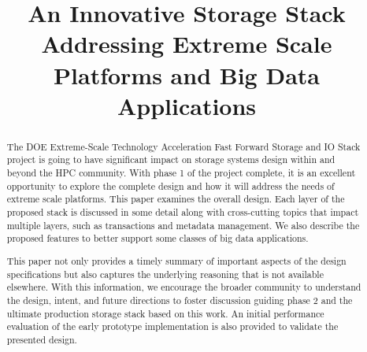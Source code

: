 \documentclass[conference]{IEEEtran}
\begin{document}

\title{An Innovative Storage Stack Addressing Extreme Scale Platforms and Big Data Applications}

\author{
}
\maketitle

\begin{abstract}
The DOE Extreme-Scale Technology Acceleration Fast Forward Storage and IO Stack
project is going to have significant impact on storage systems design within
and beyond the HPC community. With phase 1 of the project complete, it is an
excellent opportunity to explore the complete design and how it will address
the needs of extreme scale platforms.  This paper examines the overall design.
Each layer of the proposed stack is discussed in some detail along with
cross-cutting topics that impact multiple layers, such as transactions and
metadata management. We also describe the proposed features to better support
some classes of big data applications.

This paper not only provides a timely summary of important aspects of the
design specifications but also captures the underlying reasoning that is not
available elsewhere. With this information, we encourage the broader community
to understand the design, intent, and future directions to foster discussion
guiding phase 2 and the ultimate production storage stack based on this work.
An initial performance evaluation of the early prototype implementation is also
provided to validate the presented design.

\end{abstract}

\end{document}
